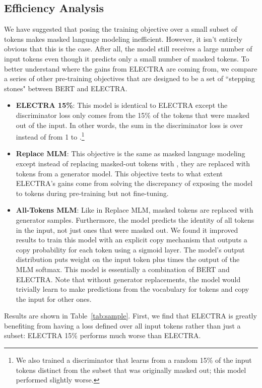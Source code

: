 \documentclass{article}
\begin{document}
\subsection{Efficiency Analysis}
We have suggested that posing the training objective over a small subset of tokens makes masked language modeling inefficient.
However, it isn't entirely obvious that this is the case.
After all, the model still receives a large number of input tokens even though it predicts only a small number of masked tokens.
To better understand where the gains from ELECTRA are coming from, we compare a series of other pre-training objectives that are designed to be a set of ``stepping stones" between BERT and ELECTRA.
\begin{itemize}
    \item \textbf{ELECTRA 15\%}: This model is identical to ELECTRA except the discriminator loss only comes from the 15\% of the tokens that were masked out of the input. In other words, the sum in the discriminator loss  is over  instead of from 1 to .\footnote{We also trained a discriminator that learns from a random 15\% of the input tokens distinct from the subset that was originally masked out; this model performed slightly worse.}
    \item \textbf{Replace MLM}: This objective is the same as masked language modeling except instead of replacing masked-out tokens with , they are replaced with tokens from a generator model. This objective tests to what extent ELECTRA's gains come from solving the discrepancy of exposing the model to  tokens during pre-training but not fine-tuning.
    \item \textbf{All-Tokens MLM}: Like in Replace MLM, masked tokens are replaced with generator samples. Furthermore, the model predicts the identity of all tokens in the input, not just ones that were masked out. 
    We found it improved results to train this model with an explicit copy mechanism that outputs a copy probability  for each token using a sigmoid layer. The model's output distribution puts  weight on the input token plus  times the output of the MLM softmax. This model is essentially a combination of BERT and ELECTRA.
    Note that without generator replacements, the model would trivially learn to make predictions from the vocabulary for  tokens and copy the input for other ones. 
\end{itemize}
Results are shown in Table~\ref{tab:sample}. 
First, we find that ELECTRA is greatly benefiting from having a loss defined over all input tokens rather than just a subset: ELECTRA 15\% performs much worse than ELECTRA. 
\end{document}

